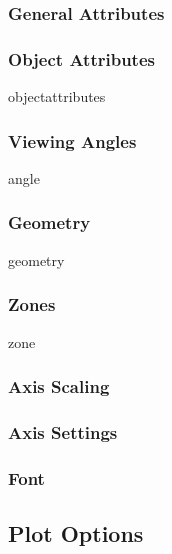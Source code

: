 \subsubsection{General Attributes}



\subsubsection{Object Attributes}

\begin{PAWf}[.5]{objectattributes}
\end{PAWf}


\subsubsection{Viewing Angles}

\begin{PAWf}{angle}
\end{PAWf}


\subsubsection{Geometry}

\begin{PAWf}[.5]{geometry}
\end{PAWf}


\subsubsection{Zones}

\begin{PAWf}{zone}
\end{PAWf}


\subsubsection{Axis Scaling}


\subsubsection{Axis Settings}


\subsubsection{Font}


\subsection{Plot Options}

